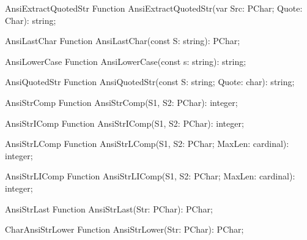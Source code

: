  
\begin{function}{AnsiExtractQuotedStr}
\Declaration
Function AnsiExtractQuotedStr(var Src: PChar; Quote: Char): string;
\Description
\Errors
\SeeAlso
\end{function}

 
\begin{function}{AnsiLastChar}
\Declaration
Function AnsiLastChar(const S: string): PChar;
\Description
\Errors
\SeeAlso
\end{function}

 
\begin{function}{AnsiLowerCase}
\Declaration
Function AnsiLowerCase(const s: string): string;
\Description
\Errors
\SeeAlso
\end{function}

 
\begin{function}{AnsiQuotedStr}
\Declaration
Function AnsiQuotedStr(const S: string; Quote: char): string;
\Description
\Errors
\SeeAlso
\end{function}

 
\begin{function}{AnsiStrComp}
\Declaration
Function AnsiStrComp(S1, S2: PChar): integer;
\Description
\Errors
\SeeAlso
\end{function}

 
\begin{function}{AnsiStrIComp}
\Declaration
Function AnsiStrIComp(S1, S2: PChar): integer;
\Description
\Errors
\SeeAlso
\end{function}

 
\begin{function}{AnsiStrLComp}
\Declaration
Function AnsiStrLComp(S1, S2: PChar; MaxLen: cardinal): integer;
\Description
\Errors
\SeeAlso
\end{function}

 
\begin{function}{AnsiStrLIComp}
\Declaration
Function AnsiStrLIComp(S1, S2: PChar; MaxLen: cardinal): integer;
\Description
\Errors
\SeeAlso
\end{function}

 
\begin{function}{AnsiStrLast}
\Declaration
Function AnsiStrLast(Str: PChar): PChar;
\Description
\Errors
\SeeAlso
\end{function}

 
\begin{function}{CharAnsiStrLower}
\Declaration
Function AnsiStrLower(Str: PChar): PChar;
\Description
\Errors
\SeeAlso
\end{function}

